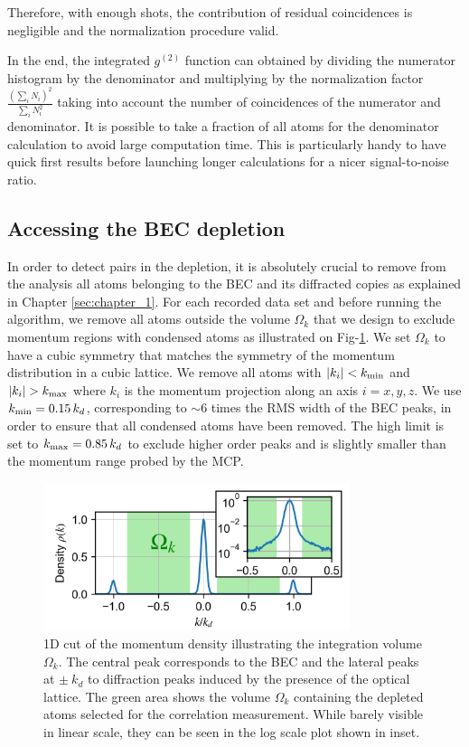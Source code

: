\noindent Therefore, with enough shots, the contribution of residual coincidences is negligible and the normalization procedure valid. 

In the end, the integrated $g^{(2)}$ function can obtained by dividing the numerator histogram by the denominator and multiplying by the normalization factor $\frac{(\sum_i N_i)^2}{\sum_i N_i^2}$ taking into account the number of coincidences of the numerator and denominator. It is possible to take a fraction of all atoms for the denominator calculation to avoid large computation time. This is particularly handy to have quick first results before launching longer calculations for a nicer signal-to-noise ratio.

\subsection{Accessing the BEC depletion}
\label{sec:accessing_depletion}

In order to detect \kmk pairs in the depletion, it is absolutely crucial to remove from the analysis all atoms belonging to the BEC and its diffracted copies as explained in Chapter \ref{sec:chapter_1}. For each recorded data set and before running the algorithm, we remove all atoms outside the volume $\Omega_k$ that we design to exclude momentum regions with condensed atoms as illustrated on Fig-\ref{fig:omega_k}. We set $\Omega_k$ to have a cubic symmetry that matches the symmetry of the momentum distribution in a cubic lattice. We remove all atoms with $|k_i| < k_{\rm{min}}$ and $|k_i| > k_{\rm{max}}$ where $k_i$ is the momentum projection along an axis $i=x,y,z$. We use $k_{\rm{min}}=0.15 \, k_d$, corresponding to $\sim 6$ times the RMS width of the BEC peaks, in order to ensure that all condensed atoms have been removed. The high limit is set to $k_{\rm{max}}=0.85 \, k_d$ to exclude higher order peaks and is slightly smaller than the momentum range probed by the MCP.

\begin{figure}
    \centering
    \includegraphics[width=0.8\textwidth]{Fig/Chapter4/densite.png}
    \caption{1D cut of the momentum density illustrating the integration volume $\Omega_k$. The central peak corresponds to the BEC and the lateral peaks at $\pm \ k_d$ to diffraction peaks induced by the presence of the optical lattice. The green area shows the volume $\Omega_k$ containing the depleted atoms selected for the correlation measurement. While barely visible in linear scale, they can be seen in the log scale plot shown in inset.}
    \label{fig:omega_k}
\end{figure}

